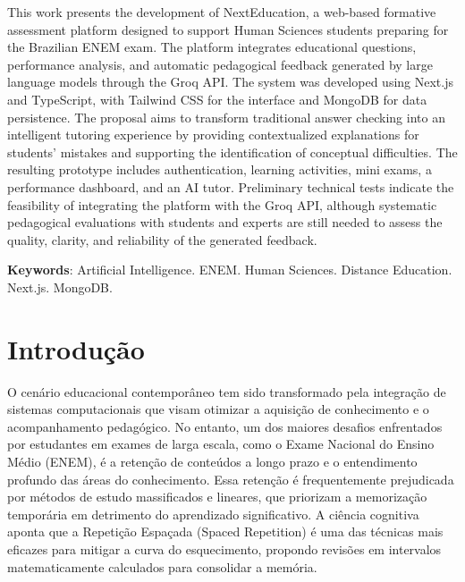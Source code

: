 \documentclass[
12pt,
openright,
oneside,
a4paper,
brazil
]{abntex2}
\begin{document}
\begin{resumo}[Abstract]

This work presents the development of NextEducation, a web-based formative assessment platform designed to support Human Sciences students preparing for the Brazilian ENEM exam. The platform integrates educational questions, performance analysis, and automatic pedagogical feedback generated by large language models through the Groq API. The system was developed using Next.js and TypeScript, with Tailwind CSS for the interface and MongoDB for data persistence. The proposal aims to transform traditional answer checking into an intelligent tutoring experience by providing contextualized explanations for students’ mistakes and supporting the identification of conceptual difficulties. The resulting prototype includes authentication, learning activities, mini exams, a performance dashboard, and an AI tutor. Preliminary technical tests indicate the feasibility of integrating the platform with the Groq API, although systematic pedagogical evaluations with students and experts are still needed to assess the quality, clarity, and reliability of the generated feedback.

\textbf{Keywords}: Artificial Intelligence. ENEM. Human Sciences. Distance Education. Next.js. MongoDB.

\end{resumo}


\tableofcontents*
\cleardoublepage


\textual


  \chapter{Introdução}

O cenário educacional contemporâneo tem sido transformado pela integração de sistemas computacionais que visam otimizar a aquisição de conhecimento e o acompanhamento pedagógico. No entanto, um dos maiores desafios enfrentados por estudantes em exames de larga escala, como o Exame Nacional do Ensino Médio (ENEM), é a retenção de conteúdos a longo prazo e o entendimento profundo das áreas do conhecimento. Essa retenção é frequentemente prejudicada por métodos de estudo massificados e lineares, que priorizam a memorização temporária em detrimento do aprendizado significativo. A ciência cognitiva aponta que a Repetição Espaçada (Spaced Repetition) \cite{ebbinghaus, cepeda, kang} é uma das técnicas mais eficazes para mitigar a curva do esquecimento, propondo revisões em intervalos matematicamente calculados para consolidar a memória.
\end{document}
